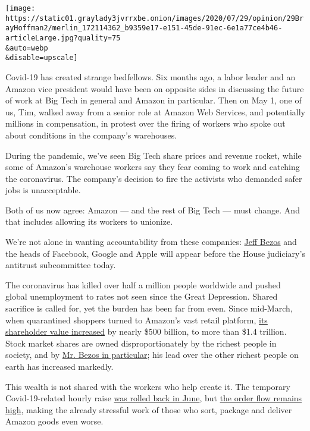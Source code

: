 \texttt{[image: https://static01.graylady3jvrrxbe.onion/images/2020/07/29/opinion/29BrayHoffman2/merlin\_172114362\_b9359e17-e151-45de-91ec-6e1a77ce4b46-articleLarge.jpg?quality=75\\\&auto=webp\\\&disable=upscale]}

Covid-19 has created strange bedfellows. Six months ago, a labor leader
and an Amazon vice president would have been on opposite sides in
discussing the future of work at Big Tech in general and Amazon in
particular. Then on May 1, one of us, Tim, walked away from a senior
role at Amazon Web Services, and potentially millions in compensation,
in protest over the firing of workers who spoke out about conditions in
the company's warehouses.

During the pandemic, we've seen Big Tech share prices and revenue
rocket, while some of Amazon's warehouse workers say they fear coming to
work and catching the coronavirus. The company's decision to fire the
activists who demanded safer jobs is unacceptable.

Both of us now agree: Amazon --- and the rest of Big Tech --- must
change. And that includes allowing its workers to unionize.

We're not alone in wanting accountability from these companies:
\href{https://www.nytimes3xbfgragh.onion/2020/07/28/technology/amazon-apple-facebook-google-antitrust-hearing.html}{Jeff
Bezos} and the heads of Facebook, Google and Apple will appear before
the House judiciary's antitrust subcommittee today.

The coronavirus has killed over half a million people worldwide and
pushed global unemployment to rates not seen since the Great Depression.
Shared sacrifice is called for, yet the burden has been far from even.
Since mid-March, when quarantined shoppers turned to Amazon's vast
retail platform,
\href{https://ycharts.com/companies/AMZN/market_cap}{its shareholder
value increased} by nearly \$500 billion, to more than \$1.4 trillion.
Stock market shares are owned disproportionately by the richest people
in society, and by
\href{https://www.vox.com/recode/2020/7/21/21332166/tech-billionaires-wealth-elon-musk-steve-ballmer-jeff-bezos-pandemic-covid}{Mr.
Bezos in particular}; his lead over the other richest people on earth
has increased markedly.

This wealth is not shared with the workers who help create it. The
temporary Covid-19-related hourly raise
\href{https://www.nytimes3xbfgragh.onion/2020/07/14/business/coronavirus-essential-workers-pay-raises.html}{was
rolled back in June}, but
\href{https://finance.yahoo.com/news/amazon-amzn-beat-q2-earnings-125512326.html}{the
order flow remains high}, making the already stressful work of those who
sort, package and deliver Amazon goods even worse.

